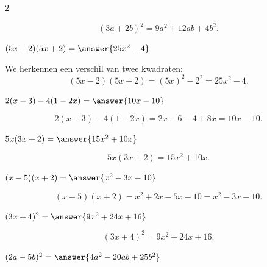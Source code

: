 \documentclass{ximera}
\begin{document}
\begin{oefening}[Uitwerken]{\oefB\ESS}
\begin{multicols}{2}
\begin{question}
    \begin{oplossing}
    \[
    (3a+2b)^2
    =9a^2+12ab+4b^2.
    \]
    \end{oplossing}
    \end{question}
    
    
    \begin{question}
    $(5x-2)(5x+2)=\answer{25x^2-4}$
    
    \begin{oplossing}
    We herkennen een verschil van twee kwadraten:
    \[
    (5x-2)(5x+2)
    =(5x)^2-2^2
    =25x^2-4.
    \]
    \end{oplossing}
    \end{question}
    
    
    \begin{question}
    $2(x-3)-4(1-2x)=\answer{10x-10}$
    
    \begin{oplossing}
    \[
    2(x-3)-4(1-2x)
    =2x-6-4+8x
    =10x-10.
    \]
    \end{oplossing}
    \end{question}
    
    
    \begin{question}
    $5x(3x+2)=\answer{15x^2+10x}$
    
    \begin{oplossing}
    \[
    5x(3x+2)
    =15x^2+10x.
    \]
    \end{oplossing}
    \end{question}
    
    
    \begin{question}
    $(x-5)(x+2)=\answer{x^2-3x-10}$
    
    \begin{oplossing}
    \[
    (x-5)(x+2)
    =x^2+2x-5x-10
    =x^2-3x-10.
    \]
    \end{oplossing}
    \end{question}
    
    
    \begin{question}
    $(3x+4)^2=\answer{9x^2+24x+16}$
    
    \begin{oplossing}
    \[
    (3x+4)^2
    =9x^2+24x+16.
    \]
    \end{oplossing}
    \end{question}
    
    
    \begin{question}
    $(2a-5b)^2=\answer{4a^2-20ab+25b^2}$
    

\end{question}
\end{multicols}
\end{oefening}
\end{document}
